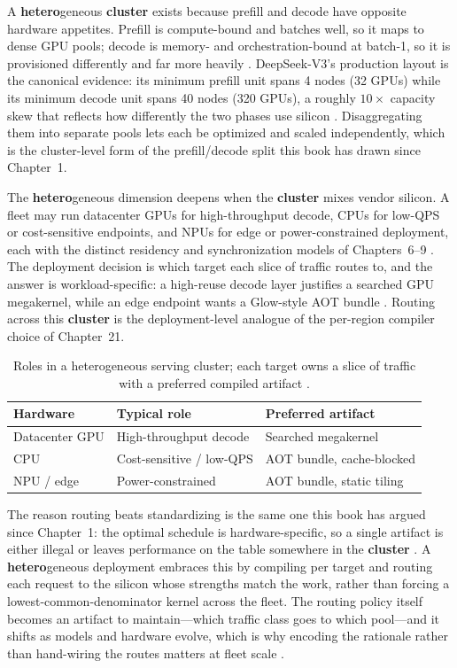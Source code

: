 A \textbf{hetero}geneous \textbf{cluster} exists because prefill and decode have opposite hardware appetites. Prefill is compute-bound and batches well, so it maps to dense GPU pools; decode is memory- and orchestration-bound at batch-1, so it is provisioned differently and far more heavily \citep{taxbreak2026,kwon2023vllm}. DeepSeek-V3's production layout is the canonical evidence: its minimum prefill unit spans 4 nodes (32 GPUs) while its minimum decode unit spans 40 nodes (320 GPUs), a roughly $10\times$ capacity skew that reflects how differently the two phases use silicon \citep{patel2025llminference}. Disaggregating them into separate pools lets each be optimized and scaled independently, which is the cluster-level form of the prefill/decode split this book has drawn since Chapter~1.

The \textbf{hetero}geneous dimension deepens when the \textbf{cluster} mixes vendor silicon. A fleet may run datacenter GPUs for high-throughput decode, CPUs for low-QPS or cost-sensitive endpoints, and NPUs for edge or power-constrained deployment, each with the distinct residency and synchronization models of Chapters~6--9 \citep{amd2024xdna,amd2024aie,rotem2018glow}. The deployment decision is which target each slice of traffic routes to, and the answer is workload-specific: a high-reuse decode layer justifies a searched GPU megakernel, while an edge endpoint wants a Glow-style AOT bundle \citep{mpk2025,rotem2018glow}. Routing across this \textbf{cluster} is the deployment-level analogue of the per-region compiler choice of Chapter~21.

\begin{table}[t]
\centering
\caption{Roles in a heterogeneous serving cluster; each target owns a slice of traffic with a preferred compiled artifact \citep{patel2025llminference,mpk2025}.}
\label{tab:ch24_cluster_roles}
\begin{tabular}{lll}
\toprule
Hardware & Typical role & Preferred artifact \\
\midrule
Datacenter GPU & High-throughput decode & Searched megakernel \\
CPU & Cost-sensitive / low-QPS & AOT bundle, cache-blocked \\
NPU / edge & Power-constrained & AOT bundle, static tiling \\
\bottomrule
\end{tabular}
\end{table}

The reason routing beats standardizing is the same one this book has argued since Chapter~1: the optimal schedule is hardware-specific, so a single artifact is either illegal or leaves performance on the table somewhere in the \textbf{cluster} \citep{amd2024xdna,semianalysis2024tma}. A \textbf{hetero}geneous deployment embraces this by compiling per target and routing each request to the silicon whose strengths match the work, rather than forcing a lowest-common-denominator kernel across the fleet. The routing policy itself becomes an artifact to maintain---which traffic class goes to which pool---and it shifts as models and hardware evolve, which is why encoding the rationale rather than hand-wiring the routes matters at fleet scale \citep{patel2025llminference,yirage2026}.

